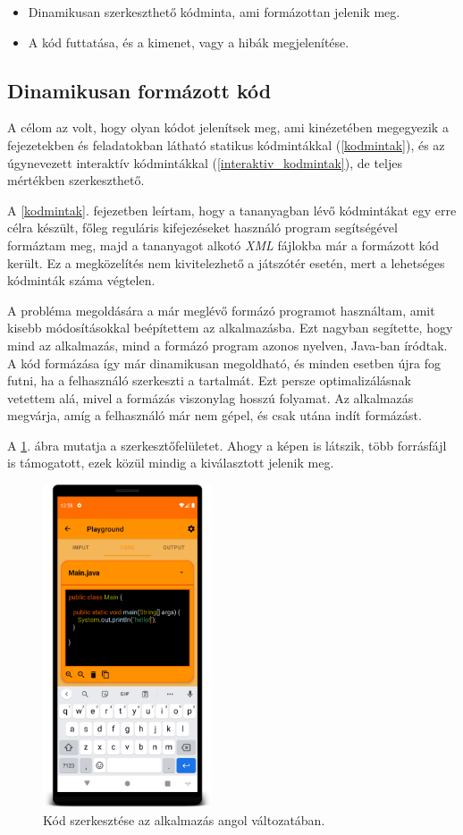 \documentclass[12pt,a4paper]{article}
\newcommand{\xml}{\textit{XML}\xspace}
\begin{document}
	\begin{itemize}
		\item Dinamikusan szerkeszthető kódminta, ami formázottan jelenik meg.
		\item A kód futtatása, és a kimenet, vagy a hibák megjelenítése.
	\end{itemize}

	\subsection{Dinamikusan formázott kód}
	
	A célom az volt, hogy olyan kódot jelenítsek meg, ami kinézetében megegyezik a fejezetekben és feladatokban látható statikus kódmintákkal (\ref{kodmintak}), és az úgynevezett interaktív kódmintákkal (\ref{interaktiv_kodmintak}), de teljes mértékben szerkeszthető.  
	
	A \ref{kodmintak}. fejezetben leírtam, hogy a tananyagban lévő kódmintákat egy erre célra készült, főleg reguláris kifejezéseket használó program segítségével formáztam meg, majd a tananyagot alkotó \xml fájlokba már a formázott kód került. Ez a megközelítés nem kivitelezhető a játszótér esetén, mert a lehetséges kódminták száma végtelen.
	
	A probléma megoldására a már meglévő formázó programot használtam, amit kisebb módosításokkal beépítettem az alkalmazásba. Ezt nagyban segítette, hogy mind az alkalmazás, mind a formázó program azonos nyelven, Java-ban íródtak. A kód formázása így már dinamikusan megoldható, és minden esetben újra fog futni, ha a felhasználó szerkeszti a tartalmát. Ezt persze optimalizálásnak vetettem alá, mivel a formázás viszonylag hosszú folyamat. Az alkalmazás megvárja, amíg a felhasználó már nem gépel, és csak utána indít formázást.
	
	A \ref{playground_code_figure}. ábra mutatja a szerkesztőfelületet. Ahogy a képen is látszik, több forrásfájl is támogatott, ezek közül mindig a kiválasztott jelenik meg.
	
	\begin{figure}[h!]
		\centering
		\includegraphics[width=5cm]{playground_code}
		\caption{Kód szerkesztése az alkalmazás angol változatában.}
		\label{playground_code_figure}
	\end{figure}
\end{document}
